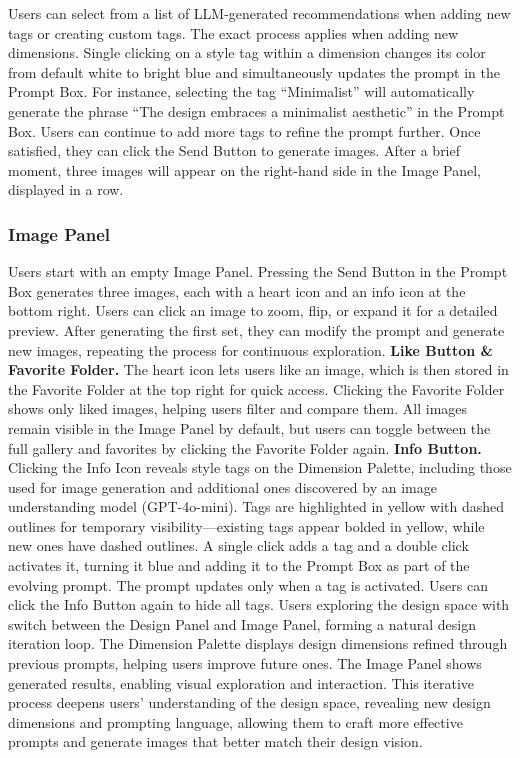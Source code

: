 Users can select from a list of LLM-generated recommendations when adding new tags or creating custom tags. The exact process applies when adding new dimensions. Single clicking on a style tag within a dimension changes its color from default white to bright blue and simultaneously updates the prompt in the Prompt Box. For instance, selecting the tag “Minimalist” will automatically generate the phrase “The design embraces a minimalist aesthetic” in the Prompt Box. Users can continue to add more tags to refine the prompt further. Once satisfied, they can click the Send Button to generate images. After a brief moment, three images will appear on the right-hand side in the Image Panel, displayed in a row.

\subsubsection{Image Panel}
Users start with an empty Image Panel. Pressing the Send Button in the Prompt Box generates three images, each with a heart icon and an info icon at the bottom right. Users can click an image to zoom, flip, or expand it for a detailed preview. After generating the first set, they can modify the prompt and generate new images, repeating the process for continuous exploration.
\newline
\textbf{Like Button \& Favorite Folder.} The heart icon lets users like an image, which is then stored in the Favorite Folder at the top right for quick access. Clicking the Favorite Folder shows only liked images, helping users filter and compare them. All images remain visible in the Image Panel by default, but users can toggle between the full gallery and favorites by clicking the Favorite Folder again.
\newline
\textbf{Info Button.} Clicking the Info Icon reveals style tags on the Dimension Palette, including those used for image generation and additional ones discovered by an image understanding model (GPT-4o-mini). Tags are highlighted in yellow with dashed outlines for temporary visibility—existing tags appear bolded in yellow, while new ones have dashed outlines. A single click adds a tag and a double click activates it, turning it blue and adding it to the Prompt Box as part of the evolving prompt. The prompt updates only when a tag is activated. Users can click the Info Button again to hide all tags.
\newline
Users exploring the design space with \toolname{} switch between the Design Panel and Image Panel, forming a natural design iteration loop. The Dimension Palette displays design dimensions refined through previous prompts, helping users improve future ones. The Image Panel shows generated results, enabling visual exploration and interaction. This iterative process deepens users' understanding of the design space, revealing new design dimensions and prompting language, allowing them to craft more effective prompts and generate images that better match their design vision.

